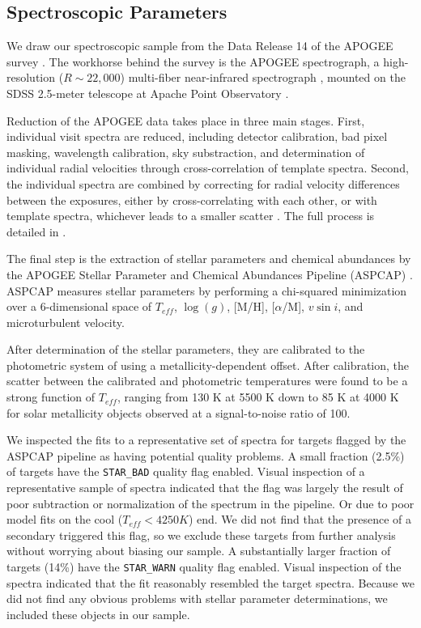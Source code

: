 \documentclass[manuscript]{aastex6}
\newcommand{\vsini}{\ensuremath{v \sin i}}
\newcommand{\Teff}{\ensuremath{T_{eff}}}
\newcommand{\logg}{\ensuremath{\log(g)}}
\newcommand{\STARBAD}{\texttt{STAR\_BAD}}
\newcommand{\STARWARN}{\texttt{STAR\_WARN}}
\begin{document}
\subsection{Spectroscopic Parameters}

We draw our spectroscopic sample from the Data Release 14 \citep{Abolfathi18}
of the APOGEE survey \citep{Majewski17}. The workhorse behind the survey is the
APOGEE spectrograph, a high-resolution (\(R \sim 22,000\)) multi-fiber
near-infrared spectrograph \citep{Wilson10}, mounted on the SDSS 2.5-meter
telescope at Apache Point Observatory \citep{Gunn06}.

Reduction of the APOGEE data takes place in three main stages. First,
individual visit spectra are reduced, including detector calibration, bad pixel
masking, wavelength calibration, sky substraction, and determination of
individual radial velocities through cross-correlation of template spectra.
Second, the individual spectra are combined by correcting for radial velocity
differences between the exposures, either by cross-correlating with each other,
or with template spectra, whichever leads to a smaller scatter
\citep{Holtzman18}. The full process is detailed in \citet{Nidever15}.

The final step is the extraction of stellar parameters and chemical abundances
by the APOGEE Stellar Parameter and Chemical Abundances Pipeline (ASPCAP)
\citep{GarciaPerez16}. ASPCAP measures stellar parameters by performing a
chi-squared minimization \citep{AllendePrieto06} over a 6-dimensional space of
\Teff, \logg, [M/H], [\(\alpha\)/M], \vsini, and microturbulent velocity.

After determination of the stellar parameters, they are calibrated to the
photometric system of \citet{GonzalezHernandez09} using a metallicity-dependent
offset. After calibration, the scatter between the calibrated and photometric
temperatures  were found to be a strong function of \Teff{}, ranging from 130 
K at 5500 K down to 85 K at 4000 K \citep{Holtzman18} for solar
metallicity objects observed at a signal-to-noise ratio of 100. 

We inspected the fits to a representative set of spectra for targets flagged 
by the ASPCAP pipeline as having potential quality problems. A small fraction
(2.5\%) of targets have the \STARBAD{} quality flag enabled. Visual inspection
of a representative sample of spectra indicated that the flag was largely the
result of poor subtraction or normalization of the spectrum in the pipeline. Or
due to poor model fits on the cool (\(\Teff < 4250 K\)) end. We did not find
that the presence of a secondary triggered this flag, so we exclude these
targets from further analysis without worrying about biasing our sample. A 
substantially larger fraction of targets (14\%) have the \STARWARN{} quality 
flag enabled. Visual inspection of the spectra indicated that the fit 
reasonably resembled the target spectra. Because we did not find any obvious 
problems with stellar parameter determinations, we included these objects in 
our sample.
\end{document}
